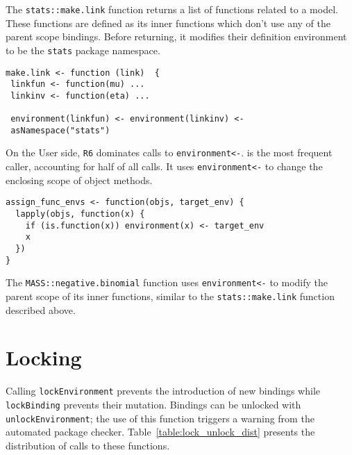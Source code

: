 \documentclass[10pt,sigplan,authorversion=true]{acmart}
\renewcommand{\c}[1]{\lstinline |#1|\xspace}
\begin{document}
The \c{stats::make.link} function returns a list of functions related to
a model. These functions are defined as its inner functions which don't use any
of the parent scope bindings. Before returning, it modifies their definition
environment to be the \c{stats} package namespace.

\begin{lstlisting}
make.link <- function (link)  {
 linkfun <- function(mu) ...
 linkinv <- function(eta) ...

 environment(linkfun) <- environment(linkinv) <-
 asNamespace("stats")
\end{lstlisting}\medskip

On the {User} side, \c{R6} dominates calls to \c{environment<-}.
\EnvAsnOneCallerName is the most frequent caller, accounting for half of all
calls. It uses \c{environment<-} to change the enclosing scope of object
methods.

\begin{lstlisting}
assign_func_envs <- function(objs, target_env) {
  lapply(objs, function(x) {
    if (is.function(x)) environment(x) <- target_env
    x
  })
}
\end{lstlisting}\medskip


The \c{MASS::negative.binomial} function uses \c{environment<-} to modify the
parent scope of its inner functions, similar to the \c{stats::make.link}
function described above.

\section{Locking}

Calling \c{lockEnvironment} prevents the introduction of new bindings while
\c{lockBinding} prevents their mutation. Bindings can be unlocked with
\c{unlockEnvironment}; the use of this function triggers a warning from the
automated package checker. Table~\ref{table:lock_unlock_dist} presents the
distribution of calls to these functions.
\end{document}
